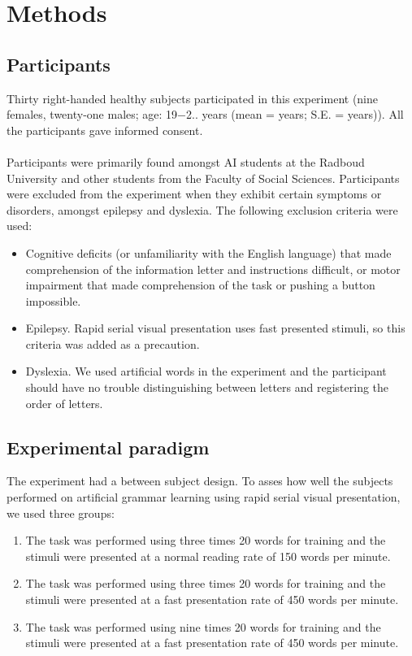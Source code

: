\section{Methods}
\label{sec:method}

\subsection{Participants}
Thirty right-handed healthy subjects participated in this experiment (nine females, twenty-one males; age: 19$-$2.. years (mean =  years; S.E. =  years)). All the participants gave informed consent.\\
\\
Participants were primarily found amongst AI students at the Radboud University and other students from the Faculty of Social Sciences. Participants were excluded from the experiment when they exhibit certain symptoms or disorders, amongst epilepsy and dyslexia. The following exclusion criteria were used:
\begin{itemize}
	\item Cognitive deficits (or unfamiliarity with the English language) that made comprehension of the information letter and instructions difficult, or motor impairment that made comprehension of the task or pushing a button impossible.
	\item Epilepsy. Rapid serial visual presentation uses fast presented stimuli, so this criteria was added as a precaution.
	\item Dyslexia. We used artificial words in the experiment and the participant should have no trouble distinguishing between letters and registering the order of letters.
\end{itemize}

\subsection{Experimental paradigm}
The experiment had a between subject design. To asses how well the subjects performed on artificial grammar learning using rapid serial visual presentation, we used three groups:
\begin{enumerate}
	\item The task was performed using three times 20 words for training and the stimuli were presented at a normal reading rate of 150 words per minute.
	\item The task was performed using three times 20 words for training and the stimuli were presented at a fast presentation rate of 450 words per minute.
	\item The task was performed using nine times 20 words for training and the stimuli were presented at a fast presentation rate of 450 words per minute.
\end{enumerate}

